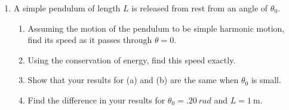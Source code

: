 \documentclass{../../../oss-apphys}
\begin{document}
\begin{enumerate}[leftmargin=15pt]
\item A simple pendulum of length $L$ is released from rest from an angle of
  $\theta_0$.
  \begin{enumerate}[leftmargin=15pt]
  \item Assuming the motion of the pendulum to be simple harmonic motion, find
    its speed as it passes through $\theta=0$.
  \item Using the conservation of energy, find this speed exactly.
  \item Show that your results for (a) and (b) are the same when $\theta_0$ is
    small.
  \item Find the difference in your results for $\theta_0=\SI{.20}{rad}$ and
    $L=\SI{1}{\metre}$.
  \end{enumerate}
  \newpage


\end{enumerate}
\end{document}
